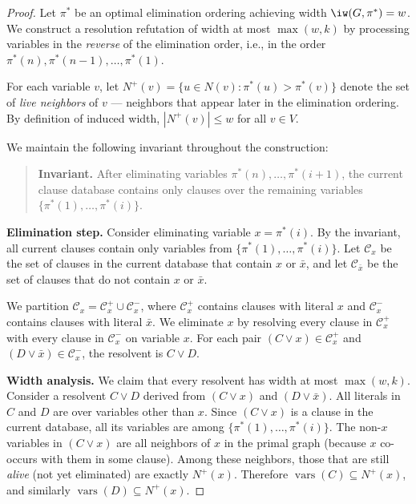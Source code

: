 \documentclass[11pt]{article}
\DeclareMathOperator{\vars}{vars}
\begin{document}
\begin{proof}
Let $\pi^*$ be an optimal elimination ordering achieving width $\iw(G, \pi^*) = w$. We construct a resolution refutation of width at most $\max(w,k)$ by processing variables in the \emph{reverse} of the elimination order, i.e., in the order $\pi^*(n), \pi^*(n-1), \ldots, \pi^*(1)$.

For each variable $v$, let $N^+(v) = \{u \in N(v) : \pi^*(u) > \pi^*(v)\}$ denote the set of \emph{live neighbors} of $v$ --- neighbors that appear later in the elimination ordering. By definition of induced width, $|N^+(v)| \leq w$ for all $v \in V$.

We maintain the following invariant throughout the construction:

\begin{quote}
\textbf{Invariant.} After eliminating variables $\pi^*(n), \ldots, \pi^*(i+1)$, the current clause database contains only clauses over the remaining variables $\{\pi^*(1), \ldots, \pi^*(i)\}$.
\end{quote}

\textbf{Elimination step.} Consider eliminating variable $x = \pi^*(i)$. By the invariant, all current clauses contain only variables from $\{\pi^*(1), \ldots, \pi^*(i)\}$. Let $\mathcal{C}_x$ be the set of clauses in the current database that contain $x$ or $\bar{x}$, and let $\mathcal{C}_{\bar{x}}$ be the set of clauses that do not contain $x$ or $\bar{x}$.

We partition $\mathcal{C}_x = \mathcal{C}_x^+ \cup \mathcal{C}_x^-$, where $\mathcal{C}_x^+$ contains clauses with literal $x$ and $\mathcal{C}_x^-$ contains clauses with literal $\bar{x}$. We eliminate $x$ by resolving every clause in $\mathcal{C}_x^+$ with every clause in $\mathcal{C}_x^-$ on variable $x$. For each pair $(C \lor x) \in \mathcal{C}_x^+$ and $(D \lor \bar{x}) \in \mathcal{C}_x^-$, the resolvent is $C \lor D$.

\textbf{Width analysis.} We claim that every resolvent has width at most $\max(w, k)$. Consider a resolvent $C \lor D$ derived from $(C \lor x)$ and $(D \lor \bar{x})$. All literals in $C$ and $D$ are over variables other than $x$. Since $(C \lor x)$ is a clause in the current database, all its variables are among $\{\pi^*(1), \ldots, \pi^*(i)\}$. The non-$x$ variables in $(C \lor x)$ are all neighbors of $x$ in the primal graph (because $x$ co-occurs with them in some clause). Among these neighbors, those that are still \emph{alive} (not yet eliminated) are exactly $N^+(x)$. Therefore $\vars(C) \subseteq N^+(x)$, and similarly $\vars(D) \subseteq N^+(x)$.


\end{proof}
\end{document}
